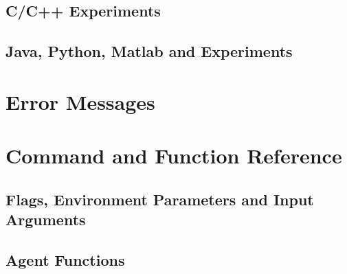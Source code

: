 \documentclass[11pt]{article}
\begin{document}
\subsection{C/C++ Experiments}
\label{exp3}


\subsection{Java, Python, Matlab and Experiments}


\section{Error Messages}
\label{error}
\section{Command and Function Reference}
\label{ref}
\subsection{Flags, Environment Parameters and Input Arguments}
\subsection{Agent Functions}
 
\end{document}
